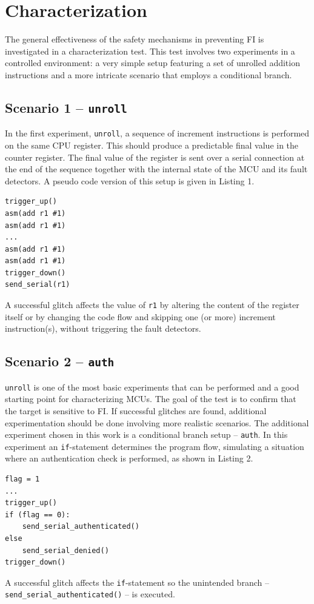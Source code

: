 \documentclass[a4paper, 10pt]{IEEEtran}
\newcommand{\unroll}{\texttt{unroll}\xspace}
\newcommand{\auth}{\texttt{auth}\xspace}
\begin{document}
\section{Characterization}
\label{sec:char}
The general effectiveness of the safety mechanisms in preventing FI is investigated in a characterization test. This test involves two experiments in a controlled environment: a very simple setup featuring a set of unrolled addition instructions and a more intricate scenario that employs a conditional branch.

\subsection{Scenario 1 -- \unroll}
In the first experiment, \unroll, a sequence of increment instructions is performed on the same CPU register. This should produce a predictable final value in the counter register. The final value of the register is sent over a serial connection at the end of the sequence together with the internal state of the MCU and its fault detectors. A pseudo code version of this setup is given in Listing 1. 
\begin{lstlisting}[title={Listing 1. \unroll scenario pseudo code}]
trigger_up()
asm(add r1 #1)
asm(add r1 #1)
...
asm(add r1 #1)
asm(add r1 #1)
trigger_down()
send_serial(r1)
\end{lstlisting}
A successful glitch affects the value of \texttt{r1} by altering the content of the register itself or by changing the code flow and skipping one (or more) increment instruction(s), without triggering the fault detectors.

\subsection{Scenario 2 -- \auth}
\unroll is one of the most basic experiments that can be performed and a good starting point for characterizing MCUs. The goal of the test is to confirm that the target is sensitive to FI. If successful glitches are found, additional experimentation should be done involving more realistic scenarios. The additional experiment chosen in this work is a conditional branch setup -- \auth. In this experiment an \texttt{if}-statement determines the program flow, simulating a situation where an authentication check is performed, as shown in Listing 2.
\begin{lstlisting}[title={Listing 2. \auth scenario pseudo code}]
flag = 1
...
trigger_up()
if (flag == 0):
    send_serial_authenticated()
else
    send_serial_denied()
trigger_down()
\end{lstlisting}
A successful glitch affects the \texttt{if}-statement so the unintended branch -- \texttt{send\_serial\_authenticated()} -- is executed.
\end{document}
